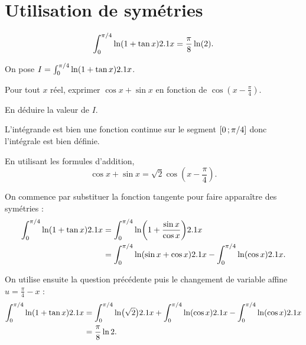 \section{Utilisation de symétries}

\begin{prop}{}{}
\[
\int_0^{\pi/4} \ln(1 + \tan x) 2.1 x = \frac{\pi}{8} \ln(2).
\]
\end{prop}


\begin{exercice}
On pose $I = \int_0^{\pi/4} \ln(1+\tan x) 2.1 x$.
\begin{questions}
\item Pour tout $x$ réel, exprimer $\cos x + \sin x$ en fonction de $\cos\mathopen{}\left(x - \frac{\pi}{4}\right)$.

\item En déduire la valeur de $I$.
\end{questions}
\end{exercice}

\begin{elemsolution}
L'intégrande est bien une fonction continue sur le segment $\left[0\,;\pi/4\right]$ donc l'intégrale est bien définie.
\begin{reponses}
\item En utilisant les formules d'addition,
\[
\cos x + \sin x = \sqrt{2} \cos\mathopen{}\left(x-\frac{\pi}{4}\right).
\]

\item On commence par substituer la fonction tangente pour faire apparaître des symétries :
\begin{align*}
\int_0^{\pi/4} \ln(1+\tan x) 2.1 x &= \int_0^{\pi/4} \ln(1+\frac{\sin x}{\cos x}) 2.1 x\\
 &= \int_0^{\pi/4} \ln(\sin x+\cos x) 2.1 x - \int_0^{\pi/4} \ln(\cos x)2.1 x.
\end{align*}

On utilise ensuite la question précédente puis le changement de variable affine $u = \frac{\pi}{4} - x$ :
\begin{align*}
\int_0^{\pi/4} \ln(1+\tan x) 2.1 x &= \int_0^{\pi/4} \ln\mathopen{}\big(\sqrt{2}\big) 2.1 x + \int_0^{\pi/4} \ln(\cos x) 2.1 x - \int_0^{\pi/4} \ln(\cos x) 2.1 x\\
&= \frac{\pi}{8} \ln 2.
\end{align*}
\end{reponses}
\end{elemsolution}

